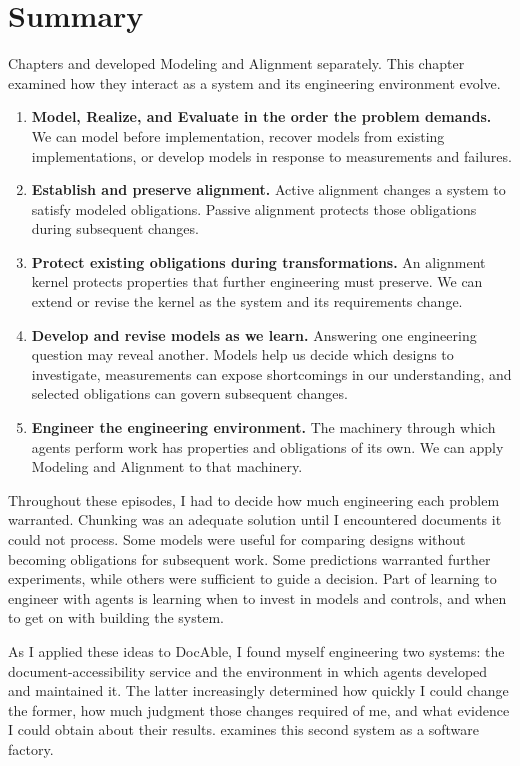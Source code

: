 


\chapter{Summary}

Chapters  and  developed Modeling and Alignment separately. This chapter examined how they interact as a system and its engineering environment evolve.

\begin{enumerate}
\item \textbf{Model, Realize, and Evaluate in the order the problem demands.} We can model before implementation, recover models from existing implementations, or develop models in response to measurements and failures.
\item \textbf{Establish and preserve alignment.} Active alignment changes a system to satisfy modeled obligations. Passive alignment protects those obligations during subsequent changes.
\item \textbf{Protect existing obligations during transformations.} An alignment kernel protects properties that further engineering must preserve. We can extend or revise the kernel as the system and its requirements change.
\item \textbf{Develop and revise models as we learn.} Answering one engineering question may reveal another. Models help us decide which designs to investigate, measurements can expose shortcomings in our understanding, and selected obligations can govern subsequent changes.
\item \textbf{Engineer the engineering environment.} The machinery through which agents perform work has properties and obligations of its own. We can apply Modeling and Alignment to that machinery.
\end{enumerate}

Throughout these episodes, I had to decide how much engineering each problem warranted. Chunking was an adequate solution until I encountered documents it could not process. Some models were useful for comparing designs without becoming obligations for subsequent work. Some predictions warranted further experiments, while others were sufficient to guide a decision. Part of learning to engineer with agents is learning when to invest in models and controls, and when to get on with building the system.

As I applied these ideas to DocAble, I found myself engineering two systems: the document-accessibility service and the environment in which agents developed and maintained it. The latter increasingly determined how quickly I could change the former, how much judgment those changes required of me, and what evidence I could obtain about their results.  examines this second system as a software factory.
